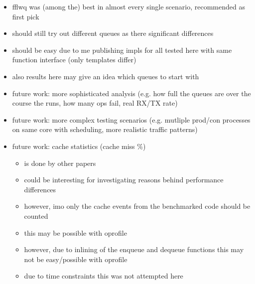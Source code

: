 \begin{itemize}
    \item fflwq was (among the) best in almost every single scenario, recommended as first pick
    \item should still try out different queues as there significant differences
    \item should be easy due to me publishing impls for all tested here with same function interface (only templates differ)
    \item also results here may give an idea which queues to start with

    \item future work: more sophisticated analysis (e.g. how full the queues are over the course the runs,
        how many ops fail, real RX/TX rate)
    \item future work: more complex testing scenarios (e.g. mutliple prod/con processes on same core with
        scheduling, more realistic traffic patterns)
    \item future work: cache statistics (cache miss \%)
        \begin{itemize}
            \item is done by other papers
            \item could be interesting for investigating reasons behind performance differences
            \item however, imo only the cache events from the benchmarked code should be counted
            \item this may be possible with oprofile
            \item however, due to inlining of the enqueue and dequeue functions this may not be easy/possible with oprofile
            \item due to time constraints this was not attempted here
        \end{itemize}
\end{itemize}
